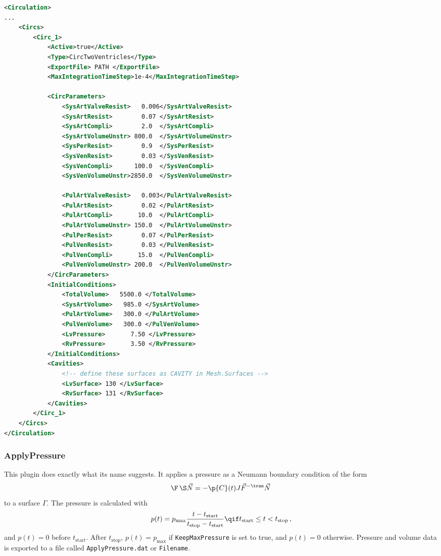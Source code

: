 \begin{lstlisting}[language=XML,caption=.xml settings for the 2-chamber circulation model]
<Circulation>
...
    <Circs>
        <Circ_1>
            <Active>true</Active>
            <Type>CircTwoVentricles</Type>
            <ExportFile> PATH </ExportFile>
            <MaxIntegrationTimeStep>1e-4</MaxIntegrationTimeStep>
            
            <CircParameters>
                <SysArtValveResist>   0.006</SysArtValveResist>
                <SysArtResist>        0.07 </SysArtResist>
                <SysArtCompli>        2.0  </SysArtCompli>
                <SysArtVolumeUnstr> 800.0  </SysArtVolumeUnstr>
                <SysPerResist>        0.9  </SysPerResist>
                <SysVenResist>        0.03 </SysVenResist>
                <SysVenCompli>      100.0  </SysVenCompli>
                <SysVenVolumeUnstr>2850.0  </SysVenVolumeUnstr>

                <PulArtValveResist>   0.003</PulArtValveResist>
                <PulArtResist>        0.02 </PulArtResist>
                <PulArtCompli>       10.0  </PulArtCompli>
                <PulArtVolumeUnstr> 150.0  </PulArtVolumeUnstr>
                <PulPerResist>        0.07 </PulPerResist>
                <PulVenResist>        0.03 </PulVenResist>
                <PulVenCompli>       15.0  </PulVenCompli>
                <PulVenVolumeUnstr> 200.0  </PulVenVolumeUnstr>
            </CircParameters>
            <InitialConditions>
                <TotalVolume>   5500.0 </TotalVolume>
                <SysArtVolume>   985.0 </SysArtVolume>
                <PulArtVolume>   300.0 </PulArtVolume>
                <PulVenVolume>   300.0 </PulVenVolume>
                <LvPressure>       7.50 </LvPressure>
                <RvPressure>       3.50 </RvPressure>
            </InitialConditions>
            <Cavities>
                <!-- define these surfaces as CAVITY in Mesh.Surfaces -->
                <LvSurface> 130 </LvSurface>
                <RvSurface> 131 </RvSurface>
            </Cavities>
        </Circ_1>
    </Circs>
</Circulation>
\end{lstlisting}

\subsubsection{ApplyPressure}
\label{plugin:ApplyPressure}

This plugin does exactly what its name suggests.
It applies a pressure as a Neumann boundary condition of the form
\begin{equation}
    \F\,\S \vec N = -\p{C}(t) J \vec F^{-\tran} \vec N \,
\end{equation}
to a surface $\Gamma$.
The pressure is calculated with
\begin{equation}
    p(t) = p_\mathrm{max} \frac{t - t_\mathrm{start}}{t_\mathrm{stop} - t_\mathrm{start}} \qif t_\mathrm{start} \leq t < t_\mathrm{stop} \,,
\end{equation}
and $p(t) = 0$ before $t_\mathrm{start}$.
After $t_\mathrm{stop}$, $p(t) = p_\mathrm{max}$ if \verb|KeepMaxPressure| is set to true, and $p(t) = 0$ otherwise.
Pressure and volume data is exported to a file called \verb|ApplyPressure.dat| or \verb|Filename|.

